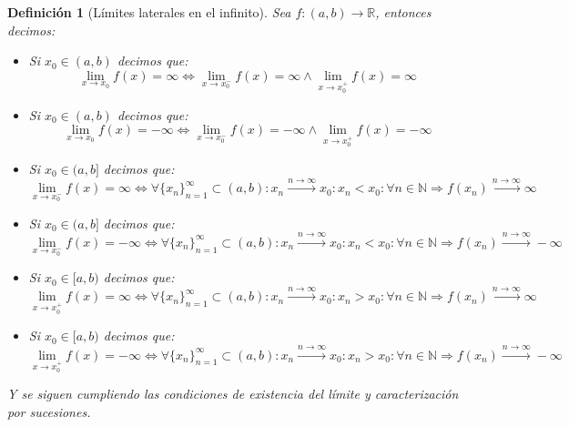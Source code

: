 \documentclass[10pt,a4paper,openright]{book}
\newtheorem{definicion}{Definición}[chapter]
\begin{document}
\begin{definicion}[Límites laterales en el infinito]
Sea $f: (a,b)\longrightarrow \mathbb R$, entonces decimos:
\begin{itemize}
\item Si $x_0\in (a,b)$ decimos que:
$$\lim_{x\rightarrow x_0}f(x)=\infty\Leftrightarrow \lim_{x\rightarrow x_0^-}f(x)=\infty \wedge \lim_{x\rightarrow x_0^+}f(x)=\infty$$

\item Si $x_0\in (a,b)$ decimos que:
$$\lim_{x\rightarrow x_0}f(x)=-\infty\Leftrightarrow \lim_{x\rightarrow x_0^-}f(x)=-\infty \wedge \lim_{x\rightarrow x_0^+}f(x)=-\infty$$

\item Si $x_0\in (a,b]$ decimos que:
$$\lim_{x\rightarrow x_0^-}f(x)=\infty\Leftrightarrow \forall \{x_n\}_{n=1}^\infty \subset (a,b): x_n\xrightarrow{n\rightarrow\infty} x_0: x_n<x_0: \forall n\in \mathbb N\Rightarrow f(x_n)\xrightarrow{n\rightarrow \infty} \infty$$

\item Si $x_0\in (a,b]$ decimos que:
$$\lim_{x\rightarrow x_0^-}f(x)=-\infty\Leftrightarrow \forall \{x_n\}_{n=1}^\infty \subset (a,b): x_n\xrightarrow{n\rightarrow\infty} x_0: x_n<x_0: \forall n\in \mathbb N\Rightarrow f(x_n)\xrightarrow{n\rightarrow \infty} -\infty$$

\item Si $x_0\in [a,b)$ decimos que:
$$\lim_{x\rightarrow x_0^+}f(x)=\infty\Leftrightarrow \forall \{x_n\}_{n=1}^\infty \subset (a,b): x_n\xrightarrow{n\rightarrow\infty} x_0: x_n>x_0: \forall n\in \mathbb N\Rightarrow f(x_n)\xrightarrow{n\rightarrow \infty} \infty$$

\item Si $x_0\in [a,b)$ decimos que:
$$\lim_{x\rightarrow x_0^+}f(x)=-\infty\Leftrightarrow \forall \{x_n\}_{n=1}^\infty \subset (a,b): x_n\xrightarrow{n\rightarrow\infty} x_0: x_n>x_0: \forall n\in \mathbb N\Rightarrow f(x_n)\xrightarrow{n\rightarrow \infty} -\infty$$
\end{itemize}

Y se siguen cumpliendo las condiciones de existencia del límite y caracterización por sucesiones.
\end{definicion}
\end{document}
